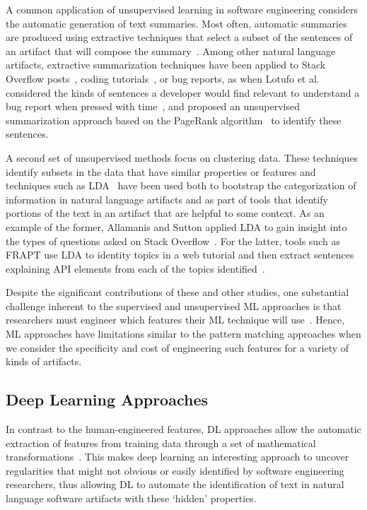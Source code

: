 A common application of unsupervised learning in software engineering
considers the automatic generation of text summaries.
Most often, automatic summaries are produced 
using extractive techniques that select a subset of 
the sentences of an artifact that will compose the summary~\cite{a}.
Among other natural language artifacts,
extractive summarization techniques
have been applied to Stack Overflow posts~\cite{a}, coding tutorials~\cite{a},
or bug reports, as
when Lotufo et al. 
considered the kinds of sentences a developer would find relevant 
to understand a bug report when pressed with time~\cite{Lotufo2012},
and proposed an unsupervised summarization approach 
based on the PageRank algorithm~\cite{Page1999}
to identify these sentences. 




A second set of unsupervised methods focus on clustering data.
These techniques identify 
subsets in the data that have similar properties or features 
and techniques such as \acf{LDA}~\cite{blei2003latent}  have been used both to 
bootstrap the categorization of information in 
natural language artifacts and as part of tools that identify 
portions of the text in an artifact that are helpful to some context. 
As an example of the former, 
 Allamanis and Sutton
applied \acs{LDA}
to gain insight into the types of questions 
asked on Stack Overflow~\cite{Allamanis2013}.
For the latter, tools such as FRAPT
use \acs{LDA} to identity topics in a web tutorial
and then extract sentences explaining API elements from each of the topics identified~\cite{Jiang2017}.


Despite the significant contributions of these and other studies,
one substantial challenge inherent to the supervised and 
unsupervised \acs{ML} approaches 
is that researchers must engineer which 
features their \acs{ML} technique will use~\cite{ferreira2021}.
Hence, \acs{ML} approaches have limitations similar to the pattern 
matching approaches when we consider 
the specificity and cost of engineering such features
for a variety of kinds of artifacts.






\subsection{Deep Learning Approaches}
\label{cp2:deep-learning}





In contrast to the human-engineered features,
\acf{DL} approaches allow the automatic extraction of features 
from training data through a set of mathematical transformations~\cite{Deng2018, zhang2021deep}.
This makes 
deep learning an interesting 
approach to
uncover regularities 
that might not obvious or easily identified
by software engineering researchers,
thus allowing \acs{DL}
to automate the identification of text in natural language software artifacts
with these `hidden' properties. 




